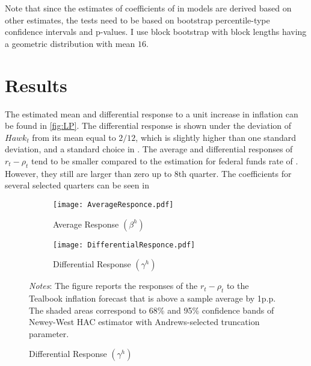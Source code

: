 \documentclass[12pt]{article}
\numberwithin{equation}{section}
\begin{document}
Note that since the estimates of coefficients of in models  are derived based on other estimates, the tests need to be based on bootstrap percentile-type confidence intervals and p-values.
I use block bootstrap with block lengths having a geometric distribution with mean $16$.



\section{Results}
The estimated mean and differential response to a unit increase in inflation can be found in \vref{fig:LP}. The differential response is shown under the deviation of $\mathit{Hawk}_t$ from its mean equal to $2/12$, which is slightly higher than one standard deviation, and a standard choice in \citet{HIM2023}. The average and differential responses of  $r_t-\rho_t$ tend to be smaller compared to the estimation for federal funds rate of \citet{HIM2023}. However, they still are larger than zero up to 8th quarter. The coefficients for several selected quarters can be seen in 

\begin{figure}[!ht]\centering
    \caption{Policy Response to Inflation and FOMC Hawkishness}\vspace{1ex}
    \label{fig:LP}
    \begin{subfigure}[b]{0.49\textwidth}
        \centering
        \caption{Average Response $(\beta^h)$}
        \label{fig:y equals x}
        \texttt{[image: AverageResponce.pdf]}
    \end{subfigure}
    \hfill
    \begin{subfigure}[b]{0.49\textwidth}
        \centering
        \caption{Differential Response $(\gamma^h)$}
        \label{fig:DifferentialResponce}
        \texttt{[image: DifferentialResponce.pdf]}
    \end{subfigure}
        {\begin{flushleft}\scriptsize\textit{Notes}: The figure reports the responses of the $r_t-\rho_t$ to the Tealbook inflation forecast that is above a sample average by 1p.p. The shaded areas correspond to 68\% and 95\% confidence bands of Newey-West HAC estimator with Andrews-selected truncation parameter.\end{flushleft}}
\end{figure}
\end{document}
